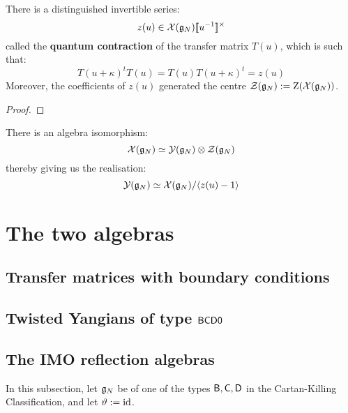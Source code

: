             \begin{lemma} \label{lemma: quantum_contractions}
                There is a distinguished invertible series:
                    $$z(u) \in \calX(\g_N)[\![u^{-1}]\!]^{\x}$$
                called the \textbf{quantum contraction} of the transfer matrix $T(u)$, which is such that:
                    \begin{equation} \label{equation: quantum_contraction}
                        T(u + \kappa)^t T(u) = T(u) T(u + \kappa)^t = z(u)
                    \end{equation}
                Moreover, the coefficients of $z(u)$ generated the centre $\mathcal{Z}(\mathfrak{g}_N) := \mathrm{Z}( \mathcal{X}(\mathfrak{g}_N) )$.
            \end{lemma}
                \begin{proof}
                    
                \end{proof}
            \begin{corollary}
                There is an algebra isomorphism:
                    $$\calX(\g_N) \cong \calY(\g_N) \tensor \calZ(\g_N)$$
                thereby giving us the realisation:
                    $$\mathcal{Y}(\mathfrak{g}_N) \simeq \mathcal{X}(\mathfrak{g}_N)/\langle z(u) - 1\rangle$$
            \end{corollary}

    \section{The two algebras}
        \subsection{Transfer matrices with boundary conditions}
    
        \subsection{Twisted Yangians of type \texorpdfstring{$\mathsf{B}\mathsf{C}\mathsf{D}\mathsf{0}$}{}}
            \begin{definition} \label{def: twisted_yangians_associated_to_symmetric_pairs}
                
            \end{definition}
    
        \subsection{The IMO reflection algebras}
            In this subsection, let $\mathfrak{g}_N$ be of one of the types $\mathsf{B}, \mathsf{C}, \mathsf{D}$ in the Cartan-Killing Classification, and let $\vartheta := \mathrm{id}$.
        
